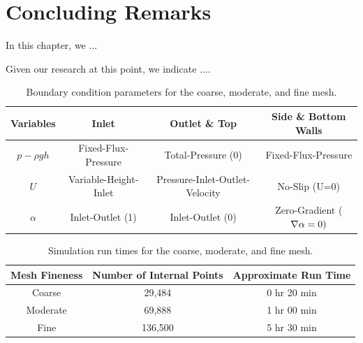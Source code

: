 \section{Concluding Remarks}

\begin{onehalfspace}
In this chapter, we ...

Given our research at this point, we indicate  .... 
\end{onehalfspace}

\newpage\null
\vfill
\begin{table}[H]
\centering{}%
\begin{tabular}{|c|c|c|c|}
\hline 
Variables & Inlet & Outlet \& Top & Side \& Bottom Walls\tabularnewline
\hline 
\hline 
$p-\rho gh$ & Fixed-Flux-Pressure & Total-Pressure (0) & Fixed-Flux-Pressure\tabularnewline
\hline 
$U$ & Variable-Height-Inlet & Pressure-Inlet-Outlet-Velocity & No-Slip (U=0)\tabularnewline
\hline 
$\alpha$ & Inlet-Outlet (1) & Inlet-Outlet (0) & Zero-Gradient ($\nabla\text{\ensuremath{\alpha}}=0)$\tabularnewline
\hline 
\end{tabular}\caption{\label{tbl:coarseboundaryCond}Boundary condition parameters for the
coarse, moderate, and fine mesh.}
\end{table}

\vfill\newpage\null
\vfill
\begin{table}[H]
\centering{}%
\begin{tabular}{|c|c|c|}
\hline 
Mesh Fineness & Number of Internal Points & Approximate Run Time\tabularnewline
\hline 
\hline 
Coarse & 29,484 & 0 hr 20 min\tabularnewline
\hline 
Moderate & 69,888 & 1 hr 00 min\tabularnewline
\hline 
Fine & 136,500 & 5 hr 30 min\tabularnewline
\hline 
\end{tabular}\caption{\label{tbl:runtime}Simulation run times for the coarse, moderate,
and fine mesh.}
\end{table}

